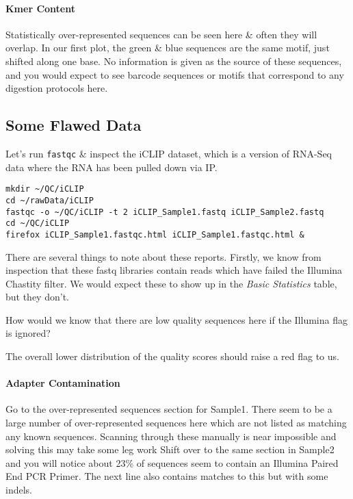 \paragraph{Kmer Content}
Statistically over-represented sequences can be seen here \& often they will overlap. 
In our first plot, the green \& blue sequences are the same motif, just shifted along one base.
No information is given as the source of these sequences, and you would expect to see barcode sequences or motifs that correspond to any digestion protocols here.

\subsection{Some Flawed Data}
Let's run \texttt{fastqc} \& inspect the iCLIP dataset, which is a version of RNA-Seq data where the RNA has been pulled down via IP.

\begin{lstlisting}
mkdir ~/QC/iCLIP
cd ~/rawData/iCLIP
fastqc -o ~/QC/iCLIP -t 2 iCLIP_Sample1.fastq iCLIP_Sample2.fastq
cd ~/QC/iCLIP
firefox iCLIP_Sample1.fastqc.html iCLIP_Sample1.fastqc.html &
\end{lstlisting}

There are several things to note about these reports.
Firstly, we know from inspection that these fastq libraries contain reads which have failed the Illumina Chastity filter.
We would expect these to show up in the \textit{Basic Statistics} table, but they don't.

\begin{questions}
How would we know that there are low quality sequences here if the Illumina flag is ignored?\\
\begin{answer}
The overall lower distribution of the quality scores should raise a red flag to us. \\
\end{answer}
\end{questions}

\paragraph{Adapter Contamination}
Go to the over-represented sequences section for Sample1.
There seem to be a large number of over-represented sequences here which are not listed as matching any known sequences.
Scanning through these manually is near impossible and solving this may take some leg work
Shift over to the same section in Sample2 and you will notice about 23\% of sequences seem to contain an Illumina Paired End PCR Primer.
The next line also contains matches to this but with some indels. \\

